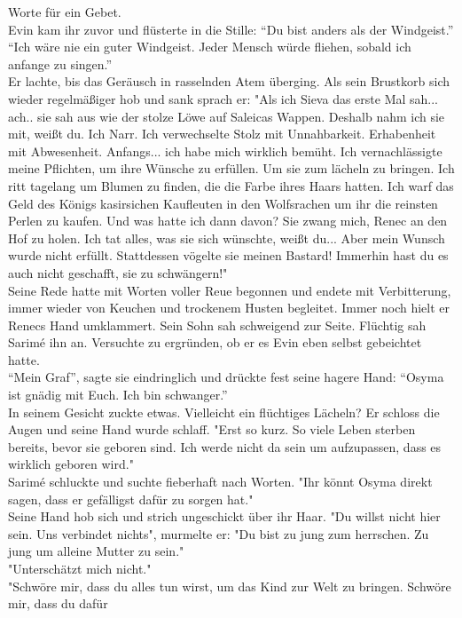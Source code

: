 Worte für ein Gebet.\\
Evin kam ihr zuvor und flüsterte in die Stille: ``Du bist anders als der Windgeist.''\\
``Ich wäre nie ein guter Windgeist. Jeder Mensch würde fliehen, sobald ich anfange zu singen.''\\
Er lachte, bis das Geräusch in rasselnden Atem überging. Als sein Brustkorb sich wieder 
regelmäßiger hob und sank sprach er: "Als ich Sieva das erste Mal sah... ach.. sie sah aus wie der 
stolze Löwe auf Saleicas Wappen. Deshalb nahm ich sie mit, weißt du. Ich Narr. Ich verwechselte 
Stolz mit Unnahbarkeit. Erhabenheit mit Abwesenheit. Anfangs... ich habe mich wirklich bemüht. Ich 
vernachlässigte meine Pflichten, um ihre Wünsche zu erfüllen. Um sie zum lächeln zu bringen. Ich 
ritt tagelang um Blumen zu finden, die die Farbe ihres Haars hatten. Ich warf das Geld des Königs 
kasirsichen Kaufleuten in den Wolfsrachen um ihr die reinsten Perlen zu kaufen. 
Und was hatte ich dann davon? Sie zwang mich, Renec an den Hof zu holen. Ich tat alles, was sie sich 
wünschte, weißt du... Aber mein Wunsch wurde nicht erfüllt. Stattdessen vögelte sie meinen Bastard! 
Immerhin hast du es auch nicht geschafft, sie zu schwängern!"\\
Seine Rede hatte mit Worten voller Reue begonnen und endete mit Verbitterung, immer wieder von 
Keuchen und trockenem Husten begleitet. Immer noch hielt er Renecs Hand umklammert. Sein Sohn sah 
schweigend zur Seite. Flüchtig sah Sarimé ihn an. Versuchte zu ergründen, ob er es Evin eben selbst 
gebeichtet hatte.\\
``Mein Graf'', sagte sie eindringlich und drückte fest seine hagere Hand: ``Osyma ist gnädig mit 
Euch. Ich bin schwanger.''\\
In seinem Gesicht zuckte etwas. Vielleicht ein flüchtiges Lächeln? Er schloss die Augen und seine 
Hand wurde schlaff. "Erst so kurz. So viele Leben sterben bereits, bevor sie geboren sind. Ich 
werde nicht da sein um aufzupassen, dass es wirklich geboren wird."\\
Sarimé schluckte und suchte fieberhaft nach Worten. "Ihr könnt Osyma direkt sagen, dass er 
gefälligst dafür zu sorgen hat."\\
Seine Hand hob sich und strich ungeschickt über ihr Haar. "Du willst nicht hier sein. Uns verbindet 
nichts", murmelte er: "Du bist zu jung zum herrschen. Zu jung um alleine Mutter zu sein."\\
"Unterschätzt mich nicht."\\
"Schwöre mir, dass du alles tun wirst, um das Kind zur Welt zu bringen. Schwöre mir, dass du dafür 
